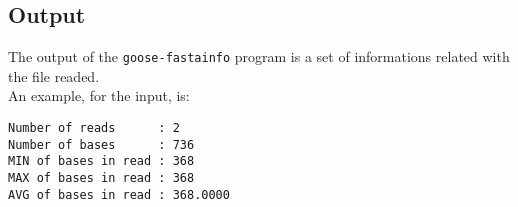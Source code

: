 \subsection*{Output}
The output of the \texttt{goose-fastainfo} program is a set of informations related with the file readed. \\
An example, for the input, is:
\begin{lstlisting}
Number of reads      : 2
Number of bases      : 736
MIN of bases in read : 368
MAX of bases in read : 368
AVG of bases in read : 368.0000
\end{lstlisting}